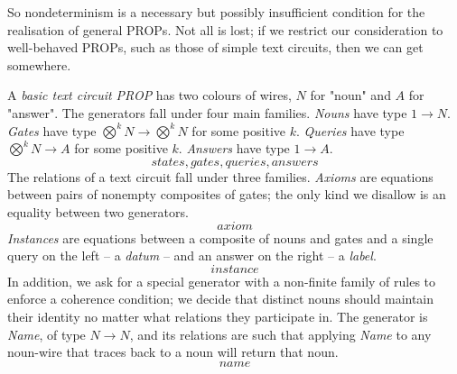 \begin{fullwidth}
So nondeterminism is a necessary but possibly insufficient condition for the realisation of general PROPs. Not all is lost; if we restrict our consideration to well-behaved PROPs, such as those of simple text circuits, then we can get somewhere.

\begin{defn}
A \emph{basic text circuit PROP} has two colours of wires, $N$ for "noun" and $A$ for "answer". The generators fall under four main families. \emph{Nouns} have type $1 \rightarrow N$. \emph{Gates} have type $\bigotimes^k N \rightarrow \bigotimes^k N$ for some positive $k$. \emph{Queries} have type $\bigotimes^k N \rightarrow A$ for some positive $k$. \emph{Answers} have type $1 \rightarrow A$.
\[states, gates, queries, answers\]
The relations of a text circuit fall under three families. \emph{Axioms} are equations between pairs of nonempty composites of gates; the only kind we disallow is an equality between two generators.
\[axiom\]
\emph{Instances} are equations between a composite of nouns and gates and a single query on the left -- a \emph{datum} -- and an answer on the right -- a \emph{label}.
\[instance\]
In addition, we ask for a special generator with a non-finite family of rules to enforce a coherence condition; we decide that distinct nouns should maintain their identity no matter what relations they participate in. The generator is \emph{Name}, of type $N \rightarrow N$, and its relations are such that applying \emph{Name} to any noun-wire that traces back to a noun will return that noun.
\[name\]
\end{defn}

\begin{example}

\end{example}


\end{fullwidth}
